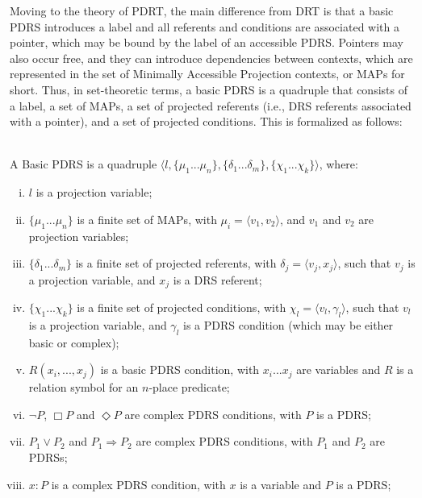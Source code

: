 Moving to the theory of PDRT, the main difference from DRT is that a basic
PDRS introduces a label and all referents and conditions are associated with
a pointer, which may be bound by the label of an accessible PDRS. Pointers
may also occur free, and they can introduce dependencies between contexts,
which are represented in the set of Minimally Accessible Projection
contexts, or MAPs for short. Thus, in set-theoretic terms, a basic PDRS is
a quadruple that consists of a label, a set of MAPs, a set of projected
referents (i.e., DRS referents associated with a pointer), and a set of
projected conditions. This is formalized as follows:

\begin{definition} \label{def:bPDRS}~\\
A Basic PDRS is a quadruple $\langle l, \{\mu_1 ... \mu_n\}, 
\{\delta_1 ... \delta_m\}, \{\chi_1 ... \chi_k\}\rangle$, where:
  \begin{enumerate}[i.]
    \item $l$ is a projection variable;
    \item $\{\mu_1 ... \mu_n\}$ is a finite set of MAPs, with $\mu_i=\langle
      v_1,v_2\rangle$, and  $v_1$ and $v_2$ are projection variables;
    \item $\{\delta_1 ... \delta_m\}$ is a finite set of projected
      referents, with $\delta_j=\langle v_j, x_j\rangle$, such that $v_j$ is
      a projection variable, and $x_j$ is a DRS referent;
    \item $\{\chi_1 ... \chi_k\}$ is a finite set of projected conditions,
      with $\chi_l = \langle v_l,\gamma_l\rangle$, such that $v_l$ is a
      projection variable, and $\gamma_l$ is a PDRS condition (which may be
      either basic or complex);
    \item \label{def:bPDRS:Rel} $R(x_i, ..., x_j)$ is a basic PDRS condition,
      with $x_i ... x_j$ are variables and $R$ is a relation symbol for an
      $n$-place predicate;
    \item $\neg P$, $\Box P$ and $\Diamond P$ are complex PDRS conditions,
      with $P$ is a PDRS;
    \item $P_1 \vee P_2$ and $P_1 \Rightarrow P_2$ are complex PDRS
      conditions, with $P_1$ and $P_2$ are PDRSs;
    \item\label{def:bPDRS:Prop} $x:P$ is a complex PDRS condition, with $x$
      is a variable and $P$ is a PDRS;
  \end{enumerate}
\end{definition}

